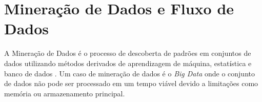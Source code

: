\section{Mineração de Dados e Fluxo de Dados}


A Mineração de Dados é o processo de descoberta de padrões em conjuntos de dados
utilizando métodos derivados de aprendizagem de máquina, estatística e banco de
dados \cite{Gaber2005}. Um caso de mineração de dados é o \emph{Big Data} onde o
conjunto de dados não pode ser processado em um tempo viável devido a limitações
como memória ou armazenamento principal.

% 
% 


% 


